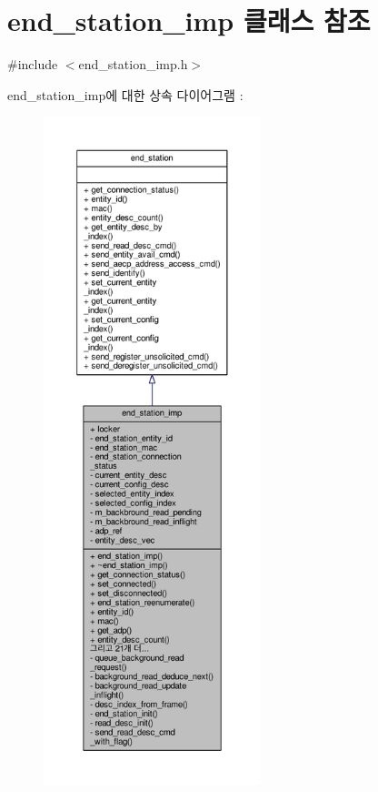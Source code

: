 \hypertarget{classavdecc__lib_1_1end__station__imp}{}\section{end\+\_\+station\+\_\+imp 클래스 참조}
\label{classavdecc__lib_1_1end__station__imp}


{\ttfamily \#include $<$end\+\_\+station\+\_\+imp.\+h$>$}



end\+\_\+station\+\_\+imp에 대한 상속 다이어그램 \+: 
\nopagebreak
\begin{figure}[H]
\begin{center}
\leavevmode
\includegraphics[height=550pt]{classavdecc__lib_1_1end__station__imp__inherit__graph}
\end{center}
\end{figure}


